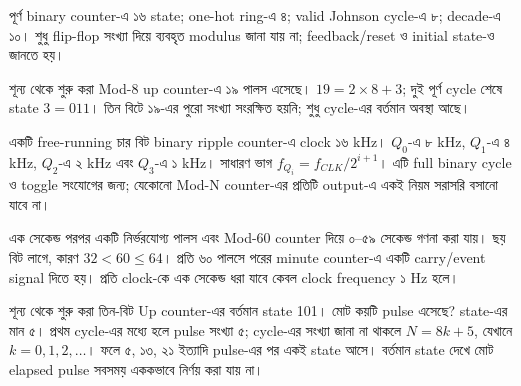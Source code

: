 \chThreeAnswer পূর্ণ binary counter-এ ১৬ state; one-hot ring-এ ৪; valid Johnson cycle-এ ৮; decade-এ ১০। শুধু flip-flop সংখ্যা দিয়ে ব্যবহৃত modulus জানা যায় না; feedback/reset ও initial state-ও জানতে হয়।

শূন্য থেকে শুরু করা Mod-8 up counter-এ ১৯ পালস এসেছে।
\chThreeAnswer $19=2\times8+3$; দুই পূর্ণ cycle শেষে state $3=011$। তিন বিটে ১৯-এর পুরো সংখ্যা সংরক্ষিত হয়নি; শুধু cycle-এর বর্তমান অবস্থা আছে।

একটি free-running চার বিট binary ripple counter-এ clock ১৬ kHz।
\chThreeAnswer $Q_0$-এ ৮ kHz, $Q_1$-এ ৪ kHz, $Q_2$-এ ২ kHz এবং $Q_3$-এ ১ kHz। সাধারণ ভাগ $f_{Q_i}=f_{CLK}/2^{i+1}$। এটি full binary cycle ও toggle সংযোগের জন্য; যেকোনো Mod-N counter-এর প্রতিটি output-এ একই নিয়ম সরাসরি বসানো যাবে না।

এক সেকেন্ড পরপর একটি নির্ভরযোগ্য পালস এবং Mod-60 counter দিয়ে ০–৫৯ সেকেন্ড গণনা করা যায়।
\chThreeAnswer ছয় বিট লাগে, কারণ $32<60\leq64$। প্রতি ৬০ পালসে পরের minute counter-এ একটি carry/event signal দিতে হয়। প্রতি clock-কে এক সেকেন্ড ধরা যাবে কেবল clock frequency ১ Hz হলে।

শূন্য থেকে শুরু করা তিন-বিট Up counter-এর বর্তমান state 101। মোট কয়টি pulse এসেছে?
\chThreeAnswer state-এর মান ৫। প্রথম cycle-এর মধ্যে হলে pulse সংখ্যা ৫; cycle-এর সংখ্যা জানা না থাকলে $N=8k+5$, যেখানে $k=0,1,2,\ldots$। ফলে ৫, ১৩, ২১ ইত্যাদি pulse-এর পর একই state আসে। বর্তমান state দেখে মোট elapsed pulse সবসময় এককভাবে নির্ণয় করা যায় না।
